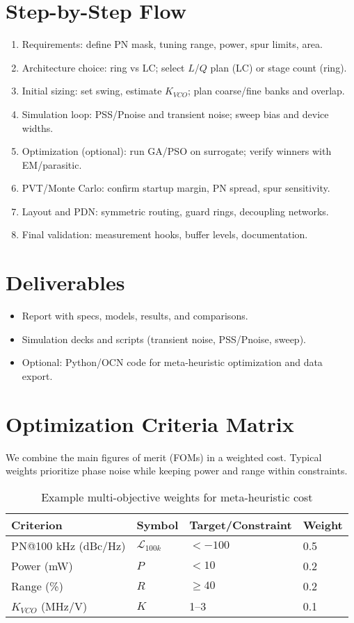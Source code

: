 \section{Step-by-Step Flow}
\begin{enumerate}
  \item Requirements: define PN mask, tuning range, power, spur limits, area.
  \item Architecture choice: ring vs LC; select $L$/$Q$ plan (LC) or stage count (ring).
  \item Initial sizing: set swing, estimate $K_{VCO}$; plan coarse/fine banks and overlap.
  \item Simulation loop: PSS/Pnoise and transient noise; sweep bias and device widths.
  \item Optimization (optional): run GA/PSO on surrogate; verify winners with EM/parasitic.
  \item PVT/Monte Carlo: confirm startup margin, PN spread, spur sensitivity.
  \item Layout and PDN: symmetric routing, guard rings, decoupling networks.
  \item Final validation: measurement hooks, buffer levels, documentation.
\end{enumerate}

\section{Deliverables}
\begin{itemize}
  \item Report with specs, models, results, and comparisons.
  \item Simulation decks and scripts (transient noise, PSS/Pnoise, sweep).
  \item Optional: Python/OCN code for meta-heuristic optimization and data export.
\end{itemize}

\section{Optimization Criteria Matrix}
We combine the main figures of merit (FOMs) in a weighted cost. Typical weights prioritize phase noise while keeping power and range within constraints.
\begin{table}[H]
  \centering
  \begin{tabular}{llll}
    \toprule
    Criterion & Symbol & Target/Constraint & Weight \\
    \midrule
    PN@100 kHz (dBc/Hz) & $\mathcal{L}_{100k}$ & $< -100$ & 0.5 \\
    Power (mW) & $P$ & $< 10$ & 0.2 \\
    Range (\%) & $R$ & $\ge 40$ & 0.2 \\
    $K_{VCO}$ (MHz/V) & $K$ & 1–3 & 0.1 \\
    \bottomrule
  \end{tabular}
  \caption{Example multi-objective weights for meta-heuristic cost}
\end{table}

